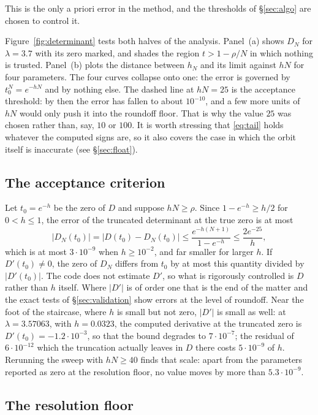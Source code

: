 \documentclass[11pt]{article}
\theoremstyle{plain}
\theoremstyle{definition}
\begin{document}
This is the only a priori error in the method, and the thresholds of \S\ref{sec:algo} are
chosen to control it.

Figure~\ref{fig:determinant} tests both halves of the analysis.  Panel~(a) shows $D_N$ for
$\lambda=3.7$ with its zero marked, and shades the region $t>1-\rho/N$ in which nothing is
trusted.  Panel~(b) plots the distance between $h_N$ and its limit against $hN$ for four
parameters.  The four curves collapse onto one: the error is governed by
$t_0^{N}=e^{-hN}$ and by nothing else.  The dashed line at $hN=25$ is the acceptance
threshold: by then the error has fallen to about $10^{-10}$, and a few more units of $hN$
would only push it into the roundoff floor.  That is why the value $25$ was chosen rather
than, say, $10$ or $100$.  It is worth stressing that \eqref{eq:tail} holds whatever the
computed signs are, so it also covers the case in which the orbit itself is inaccurate
(see \S\ref{sec:float}).

\subsection{The acceptance criterion}

Let $t_0=e^{-h}$ be the zero of $D$ and suppose $hN\ge\rho$.  Since $1-e^{-h}\ge h/2$ for
$0<h\le1$, the error of the truncated determinant at the true zero is at most
\[
  \bigl|D_N(t_0)\bigr|=\bigl|D(t_0)-D_N(t_0)\bigr|
  \le\frac{e^{-h(N+1)}}{1-e^{-h}}\le\frac{2e^{-25}}{h},
\]
which is at most $3\cdot10^{-9}$ when $h\ge10^{-2}$, and far smaller for larger $h$.  If
$D'(t_0)\ne0$, the zero of $D_N$ differs from $t_0$ by at most this quantity divided by
$|D'(t_0)|$.  The code does not estimate $D'$, so what is rigorously controlled is $D$
rather than $h$ itself.  Where $|D'|$ is of order one that is the end of the matter and the
exact tests of \S\ref{sec:validation} show errors at the level of roundoff.  Near the foot of
the staircase, where $h$ is small but not zero, $|D'|$ is small as well: at
$\lambda=3.57063$, with $h=0.0323$, the computed derivative at the truncated zero is
$D'(t_0)=-1.2\cdot10^{-3}$, so that the bound degrades to $7\cdot10^{-7}$; the residual of
$6\cdot10^{-12}$ which the truncation actually leaves in $D$ there costs $5\cdot10^{-9}$ of
$h$.  Rerunning the sweep with $hN\ge40$ finds that scale: apart from the parameters reported
as zero at the resolution floor, no value moves by more than $5.3\cdot10^{-9}$.

\subsection{The resolution floor}
\end{document}

